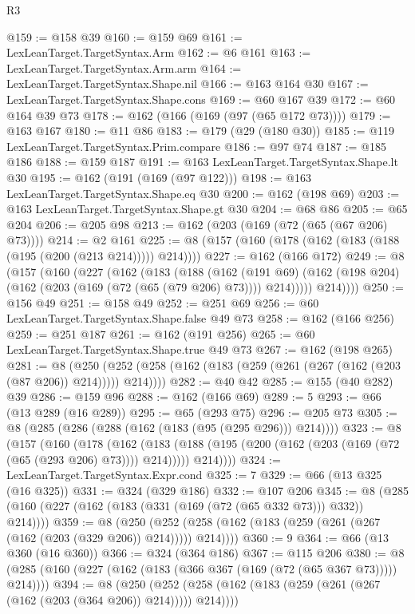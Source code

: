 \begin{lexlean}{R3}
\begin{coremodule}
@159 := @158 @39
@160 := @159 @69
@161 := LexLeanTarget.TargetSyntax.Arm
@162 := @6 @161
@163 := LexLeanTarget.TargetSyntax.Arm.arm
@164 := LexLeanTarget.TargetSyntax.Shape.nil
@166 := @163 @164 @30
@167 := LexLeanTarget.TargetSyntax.Shape.cons
@169 := @60 @167 @39
@172 := @60 @164 @39 @73
@178 := @162 (@166 (@169 (@97 (@65 @172 @73))))
@179 := @163 @167
@180 := @11 @86
@183 := @179 (@29 (@180 @30))
@185 := @119 LexLeanTarget.TargetSyntax.Prim.compare
@186 := @97 @74
@187 := @185 @186
@188 := @159 @187
@191 := @163 LexLeanTarget.TargetSyntax.Shape.lt @30
@195 := @162 (@191 (@169 (@97 @122)))
@198 := @163 LexLeanTarget.TargetSyntax.Shape.eq @30
@200 := @162 (@198 @69)
@203 := @163 LexLeanTarget.TargetSyntax.Shape.gt @30
@204 := @68 @86
@205 := @65 @204
@206 := @205 @98
@213 := @162 (@203 (@169 (@72 (@65 (@67 @206) @73))))
@214 := @2 @161
@225 := @8 (@157 (@160 (@178 (@162 (@183 (@188 (@195 (@200 (@213 @214))))) @214))))
@227 := @162 (@166 @172)
@249 := @8
    (@157
      (@160
        (@227
          (@162
            (@183
              (@188
                (@162
                  (@191 @69)
                  (@162 (@198 @204) (@162 (@203 (@169 (@72 (@65 (@79 @206) @73)))) @214)))))
            @214))))
@250 := @156 @49
@251 := @158 @49
@252 := @251 @69
@256 := @60 LexLeanTarget.TargetSyntax.Shape.false @49 @73
@258 := @162 (@166 @256)
@259 := @251 @187
@261 := @162 (@191 @256)
@265 := @60 LexLeanTarget.TargetSyntax.Shape.true @49 @73
@267 := @162 (@198 @265)
@281 := @8
    (@250 (@252 (@258 (@162 (@183 (@259 (@261 (@267 (@162 (@203 (@87 @206)) @214))))) @214))))
@282 := @40 @42
@285 := @155 (@40 @282) @39
@286 := @159 @96
@288 := @162 (@166 @69)
@289 := 5
@293 := @66 (@13 @289 (@16 @289))
@295 := @65 (@293 @75)
@296 := @205 @73
@305 := @8 (@285 (@286 (@288 (@162 (@183 (@95 (@295 @296))) @214))))
@323 := @8
    (@157
      (@160
        (@178
          (@162
            (@183 (@188 (@195 (@200 (@162 (@203 (@169 (@72 (@65 (@293 @206) @73)))) @214)))))
            @214))))
@324 := LexLeanTarget.TargetSyntax.Expr.cond
@325 := 7
@329 := @66 (@13 @325 (@16 @325))
@331 := @324 (@329 @186)
@332 := @107 @206
@345 := @8 (@285 (@160 (@227 (@162 (@183 (@331 (@169 (@72 (@65 @332 @73))) @332)) @214))))
@359 := @8
    (@250 (@252 (@258 (@162 (@183 (@259 (@261 (@267 (@162 (@203 (@329 @206)) @214))))) @214))))
@360 := 9
@364 := @66 (@13 @360 (@16 @360))
@366 := @324 (@364 @186)
@367 := @115 @206
@380 := @8 (@285 (@160 (@227 (@162 (@183 (@366 @367 (@169 (@72 (@65 @367 @73))))) @214))))
@394 := @8
    (@250 (@252 (@258 (@162 (@183 (@259 (@261 (@267 (@162 (@203 (@364 @206)) @214))))) @214))))

\end{coremodule}
\end{lexlean}
